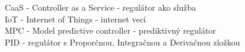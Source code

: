 CaaS - Controller as a Service - regulátor ako služba \\
IoT - Internet of Things - internet vecí \\
MPC - Model predictive controller - prediktivný regulátor \\
PID - regulátor s Proporčnou, Integračnou a Derivačnou zložkou
